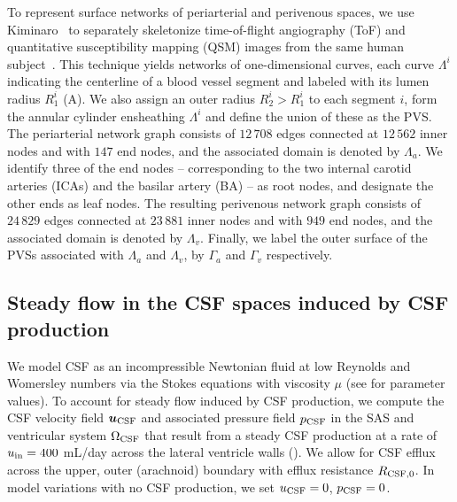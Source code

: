 \documentclass[fleqn,10pt]{wlscirep}
\begin{document}
To represent surface networks of periarterial and perivenous spaces,
we use Kiminaro~\cite{william_silversmith_2021_5539913} to separately
skeletonize time-of-flight angiography (ToF) and quantitative
susceptibility mapping (QSM) images from the same human
subject~\cite{hodneland2019new}. This technique yields networks of
one-dimensional curves, each curve $\Lambda^i$ indicating the
centerline of a blood vessel segment and labeled with its lumen radius
$R_1^i$ (A). We also assign an
outer radius $R_2^i > R_1^i$ to each segment $i$, form the annular
cylinder ensheathing $\Lambda^i$ and define the union of these as the
PVS. The periarterial network graph consists of $12\,708$ edges
connected at $12\,562$ inner nodes and with $147$ end nodes, and the
associated domain is denoted by $\Lambda_a$. We identify three of the
end nodes -- corresponding to the two internal carotid arteries (ICAs)
and the basilar artery (BA) -- as root nodes, and designate the other
ends as leaf nodes. The resulting perivenous network graph consists of
$24\,829$ edges connected at $23\,881$ inner nodes and with $949$ end nodes, and the associated domain is denoted by $\Lambda_v$. Finally, we label the outer surface of the PVSs associated with $\Lambda_a$ and $\Lambda_v$, by $\Gamma_a$ and $\Gamma_v$ respectively.

\subsection*{Steady flow in the CSF spaces induced by CSF production}

We model CSF as an incompressible Newtonian fluid at low Reynolds and
Womersley numbers via the Stokes equations with viscosity $\mu$ (see
 for parameter values). To account for steady
flow induced by CSF production, we compute the CSF velocity field $\bm
u_{\rm CSF}$ and associated pressure field $p_{\rm CSF}$ in the SAS
and ventricular system $\Omega_{\rm CSF}$ that result from a steady
CSF production at a rate of $u_{\rm in} = 400$ mL/day across the
lateral ventricle walls (). We allow for CSF efflux
across the upper, outer (arachnoid) boundary with efflux resistance
$R_{\rm CSF, 0}$. In model variations with no CSF production, we set
$u_{\rm CSF} = 0$, $p_{\rm CSF} = 0$.


\end{document}
